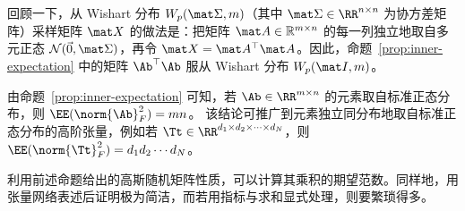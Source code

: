 回顾一下，从 Wishart 分布 $W_p(\mat \Sigma, m)$（其中 $\mat \Sigma \in \RR^{n\times n}$ 为协方差矩阵）采样矩阵 $\mat X$ 的做法是：把矩阵 $\mat A\in\mathbb R^{m\times n}$ 的每一列独立地取自多元正态 $\mathcal N(\vec 0 , \mat \Sigma)$，再令 $\mat X = \mat A^\top\mat A$。因此，命题~\ref{prop:inner-expectation} 中的矩阵 $\Ab ^\top \Ab$ 服从 Wishart 分布  $W_p(\mat I,m)$。
\begin{remark} 由命题~\ref{prop:inner-expectation} 可知，若 $\Ab \in \RR^{m \times n}$ 的元素取自标准正态分布，则 $\EE(\norm{\Ab}_F^2) = mn$。 
该结论可推广到元素独立同分布地取自标准正态分布的高阶张量，例如若 $\Tt\in\RR^{d_1\times d_2\times\cdots\times d_N}$，则 $\EE(\norm{\Tt}_F^2) = d_1d_2\cdots d_N$。
\end{remark}
利用前述命题给出的高斯随机矩阵性质，可以计算其乘积的期望范数。同样地，用张量网络表述后证明极为简洁，而若用指标与求和显式处理，则要繁琐得多。
